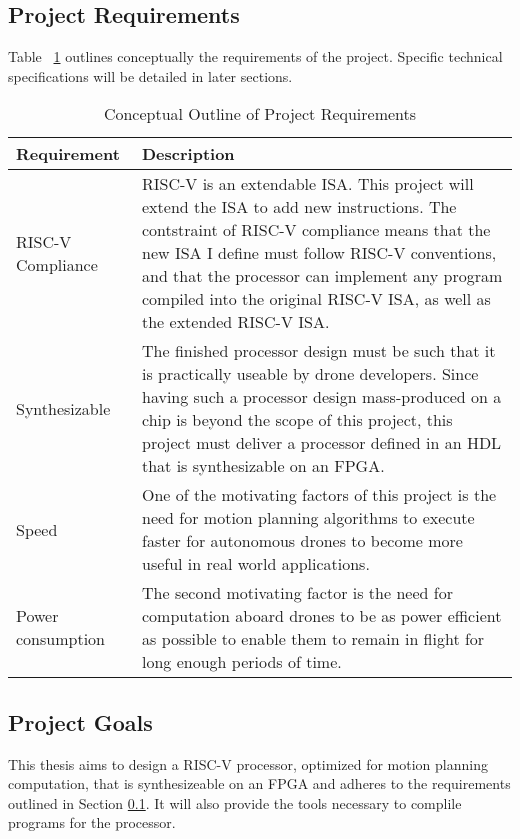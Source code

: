 \documentclass[11pt, oneside]{article}      %
\begin{document}
\subsection{Project Requirements} \label{subsection:projectRequirements}
Table ~\ref{table:projectRequirements} outlines conceptually the requirements of the project. Specific technical specifications will be detailed in later sections. 

\begin{table}[h]
\begin{centering}
\begin{tabular}{| m{0.25\linewidth} | m{0.75\linewidth} |}
\hline
\textbf{Requirement}       & \textbf{Description} \\
\hline
RISC-V Compliance   & RISC-V is an extendable \ac{ISA}. This project will extend the \ac{ISA} to add new instructions. The contstraint of RISC-V compliance means that the new ISA I define must follow RISC-V conventions, and that the processor can implement any program compiled into the original RISC-V ISA, as well as the extended RISC-V ISA.\\
\hline
Synthesizable       & The finished processor design must be such that it is practically useable by drone developers. Since having such a processor design mass-produced on a chip is beyond the scope of this project, this project must deliver a processor defined in an \ac{HDL} that is synthesizable on an FPGA.\\
\hline
Speed               & One of the motivating factors of this project is the need for motion planning algorithms to execute faster for autonomous drones to become more useful in real world applications. \\
\hline
Power consumption   & The second motivating factor is the need for computation aboard drones to be as power efficient as possible to enable them to remain in flight for long enough periods of time.\\
\hline
\end{tabular}
\caption{Conceptual Outline of Project Requirements}
\label{table:projectRequirements}
\end{centering}
\end{table}

\subsection{Project Goals} \label{subsection:projectGoals}
This thesis aims to design a RISC-V processor, optimized for motion planning computation, that is synthesizeable on an \ac{FPGA} and adheres to the requirements outlined in Section \ref{subsection:projectRequirements}. It will also provide the tools necessary to complile programs for the processor. 
\end{document}
